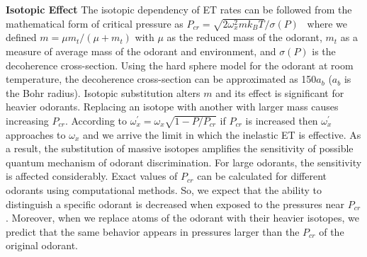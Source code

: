 \documentclass[aps,prl,tightenlines,onecolumn,superscriptaddress]{revtex4}
\begin{document}
{\bf Isotopic Effect} The isotopic dependency of ET rates can be followed from the mathematical form of critical pressure as $P_{cr}=\sqrt{2\omega_{x}^{2}mk_{B}T}/\sigma(P)$~\cite{Wea} where we defined $m=\mu m_{t}/(\mu+m_{t})$ with $\mu$ as the reduced mass of the odorant, $m_{t}$ as a measure of average mass of the odorant and environment, and $\sigma(P)$ is the decoherence cross-section. Using the hard sphere model for the odorant at room temperature, the decoherence cross-section can be approximated as 150$a_{b}$ ($a_{b}$ is the Bohr radius). Isotopic substitution alters $m$ and its effect is significant for heavier odorants. Replacing an isotope with another with larger mass causes increasing $P_{cr}$. According to $\omega_{x}^{\prime}=\omega_{x}\sqrt{1-P/P_{cr}}$ if $P_{cr}$ is increased then $\omega_{x}^{\prime}$ approaches to $\omega_{x}$ and we arrive the limit in which the inelastic ET is effective. As a result, the substitution of massive isotopes amplifies the sensitivity of possible quantum mechanism of odorant discrimination. For large odorants, the sensitivity is affected considerably. Exact values of $P_{cr}$ can be calculated for different odorants using computational methods. So, we expect that the ability to distinguish a specific odorant is decreased when exposed to the pressures near $P_{cr}$. Moreover, when we replace atoms of the odorant with their heavier isotopes, we predict that the same behavior appears in pressures larger than the $P_{cr}$ of the original odorant.\\
\end{document}
